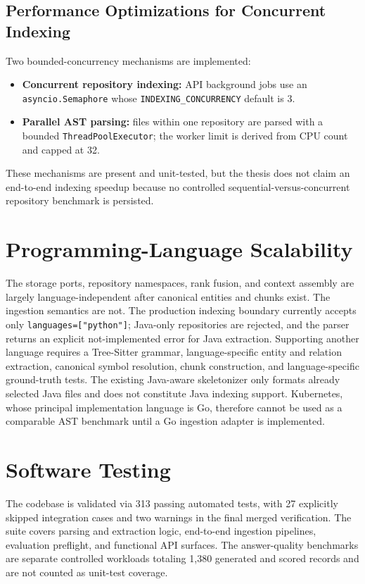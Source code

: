\documentclass[12pt,letterpaper,oneside]{report}
\begin{document}
\subsection{Performance Optimizations for Concurrent Indexing}
Two bounded-concurrency mechanisms are implemented:
\begin{itemize}
    \item \textbf{Concurrent repository indexing:} API background jobs use an \texttt{asyncio.Semaphore} whose \texttt{INDEXING\_\allowbreak CONCURRENCY} default is 3.
    \item \textbf{Parallel AST parsing:} files within one repository are parsed with a bounded \texttt{ThreadPool\allowbreak Executor}; the worker limit is derived from CPU count and capped at 32.
\end{itemize}
These mechanisms are present and unit-tested, but the thesis does not claim an end-to-end indexing speedup because no controlled sequential-versus-concurrent repository benchmark is persisted.

\section{Programming-Language Scalability}
The storage ports, repository namespaces, rank fusion, and context assembly are largely language-independent after canonical entities and chunks exist. The ingestion semantics are not. The production indexing boundary currently accepts only \texttt{languages=["python"]}; Java-only repositories are rejected, and the parser returns an explicit not-implemented error for Java extraction. Supporting another language requires a Tree-Sitter grammar, language-specific entity and relation extraction, canonical symbol resolution, chunk construction, and language-specific ground-truth tests. The existing Java-aware skeletonizer only formats already selected Java files and does not constitute Java indexing support. Kubernetes, whose principal implementation language is Go, therefore cannot be used as a comparable AST benchmark until a Go ingestion adapter is implemented.

\section{Software Testing}
The codebase is validated via 313 passing automated tests, with 27 explicitly skipped integration cases and two warnings in the final merged verification. The suite covers parsing and extraction logic, end-to-end ingestion pipelines, evaluation preflight, and functional API surfaces. The answer-quality benchmarks are separate controlled workloads totaling 1,380 generated and scored records and are not counted as unit-test coverage.
\end{document}
